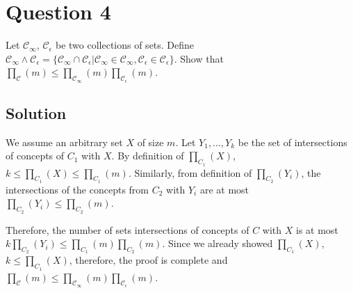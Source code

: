 
\section*{Question 4}

Let $\mathcal{C}_\infty$, $\mathcal{C}_\epsilon$ be two collections of sets.
Define  $\mathcal{C}_\infty \wedge \mathcal{C}_\epsilon = \{ \mathcal{C}_\infty \cap \mathcal{C}_\epsilon | \mathcal{C}_\infty \in \mathcal{C}_\infty, \mathcal{C}_\epsilon \in \mathcal{C}_\epsilon \}$.
Show that $\prod_\mathcal{C}(m) \leq \prod_{\mathcal{C}_\infty}(m) \prod_{\mathcal{C}_\epsilon}(m)$.

\subsection*{Solution}

We assume an arbitrary set $X$ of size $m$.
Let $Y_1, ..., Y_k$ be the set of intersections of concepts of $C_1$ with $X$.
By definition of $\prod_{C_1}(X)$,
$k \leq \prod_{C_1}(X) \leq \prod_{C_1}(m)$.
Similarly, from definition of $\prod_{C_2}(Y_i)$, the intersections of the concepts from $C_2$ with $Y_i$ are at most $\prod_{C_2}(Y_i) \leq \prod_{C_2}(m)$.

Therefore, the number of sets intersections of concepts of $C$ with $X$ is at most
$k \prod_{C_2} (Y_i) \leq \prod_{C_1}(m) \prod_{C_2}(m)$.
Since we already showed $\prod_{C_1}(X)$,
$k \leq \prod_{C_1}(X)$, therefore, the proof is complete and $\prod_\mathcal{C}(m) \leq \prod_{\mathcal{C}_\infty}(m) \prod_{\mathcal{C}_\epsilon}(m)$.
